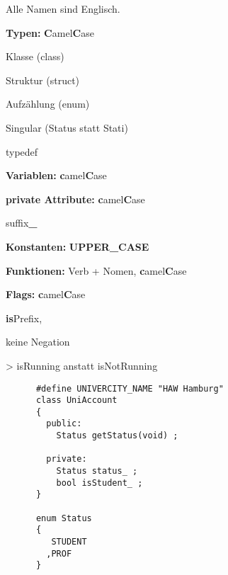 \documentclass[
   draft=false
  ,paper=a4
  ,twoside=false
  ,fontsize=11pt
  ,headsepline
  ,DIV=11
  ,parskip=full+
  ,titlepage
]{scrartcl} %
\begin{document}
  \begin{minipage}[t]{0.45\linewidth}
  Alle Namen sind Englisch. 
  \begin{compactitem}
  \item[\textbf{Typen:}] \textbf{C}amel\textbf{C}ase 
    \begin{compactitem}
    \item Klasse (class)
    \item Struktur (struct)
    \item Aufzählung (enum)
      \begin{compactitem}
      \item Singular (Status statt Stati)
      \end{compactitem}
    \item typedef
    \end{compactitem}
  \item[\textbf{Variablen:}] \textbf{c}amel\textbf{C}ase
  \item[\textbf{private Attribute:}] \textbf{c}amel\textbf{C}ase
  \begin{compactitem}
    \item suffix\textbf{\_} 
  \end{compactitem}  
  \item[\textbf{Konstanten:}] \textbf{UPPER\_CASE} 
  \item[\textbf{Funktionen:}] Verb + Nomen, \textbf{c}amel\textbf{C}ase 
  \item[\textbf{Flags:}] \textbf{c}amel\textbf{C}ase
    \begin{compactitem}
    \item \textbf{is}Prefix, 
    \item keine Negation 
    \item > isRunning anstatt isNotRunning
    \end{compactitem} 
  \end{compactitem}
  \end{minipage}%
  \hfill
  \begin{minipage}[t]{0.5\linewidth}
    \begin{lstlisting}
      #define UNIVERCITY_NAME "HAW Hamburg" 
      class UniAccount
      {
        public:
          Status getStatus(void) ;
      
        private:
          Status status_ ;
          bool isStudent_ ;
      }
      
      enum Status 
      {
         STUDENT
        ,PROF
      }     
    \end{lstlisting}
  \end{minipage}%
\end{document}
